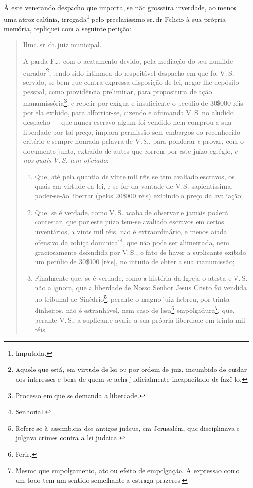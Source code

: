 À este venerando despacho que importa, se não grosseira inverdade, ao
menos uma atroz calúnia, irrogada\footnote{ Imputada.} pelo
preclaríssimo sr.\,dr.\,Felicio à sua própria memória, repliquei com a
seguinte petição:

\begin{quote}
Ilmo.\,sr.\,dr.\,juiz municipal.

A parda F\ldots{}, com o acatamento devido, pela mediação do seu humilde
curador\footnote{ Aquele que está, em virtude de lei ou por ordem de
  juiz, incumbido de cuidar dos interesses e bens de quem se acha
  judicialmente incapacitado de fazê-lo.}, tendo sido intimada do
respeitável despacho em que foi V.\,S. servido, se bem que contra
expressa disposição de lei, negar-lhe depósito pessoal, como providência
preliminar, para propositura de ação manumissória\footnote{ Processo em
  que se demanda a liberdade.}, e repelir por exígua e insuficiente o
pecúlio de 30\$000 réis por ela exibido, para alforriar-se, dizendo e
afirmando V.\,S. no aludido despacho --- que nunca escravo algum foi
vendido nem comprou a sua liberdade por tal preço, implora permissão sem
embargos do reconhecido critério e sempre honrada palavra de V.\,S., para
ponderar e provar, com o documento junto, extraído de autos que correm
por este juízo egrégio, \emph{e nos quais V.\,S. tem oficiado}:

\begin{enumerate}[label=\arabic*º]
\item Que, até pela quantia de vinte mil réis se tem avaliado escravos,
os quais em virtude da lei, e se for da vontade de V.\,S. sapientíssima,
poder-se-ão libertar (pelos 20\$000 réis) exibindo o preço da avaliação;

\item Que, se é verdade, como V.\,S. acaba de observar e jamais poderá
contestar, que por este juízo tem-se avaliado escravos em certos
inventários, a vinte mil réis, não é extraordinário, e menos ainda
ofensivo da cobiça dominical\footnote{ Senhorial.}, que não pode ser
alimentada, nem graciosamente defendida por V.\,S., o fato de haver a
suplicante exibido um pecúlio de 30\$000 {[}réis{]}, no intuito de obter
a sua manumissão;

\item Finalmente que, se é verdade, como a história da Igreja o atesta e
V.\,S. não a ignora, que a liberdade de Nosso Senhor Jesus Cristo foi
vendida no tribunal de Sinédrio\footnote{ Refere-se à assembleia dos
  antigos judeus, em Jerusalém, que disciplinava e julgava crimes contra
  a lei judaica.}, perante o magno juiz hebreu, por trinta dinheiros,
não é estranhável, nem caso de lesa\footnote{ Ferir.}
empolgadura\footnote{ Mesmo que empolgamento, ato ou efeito de
  empolgação. A expressão como um todo tem um sentido semelhante a
  estraga-prazeres.}, que, perante V.\,S., a suplicante avalie a sua
própria liberdade em trinta mil réis.
\end{enumerate}


\end{quote}
